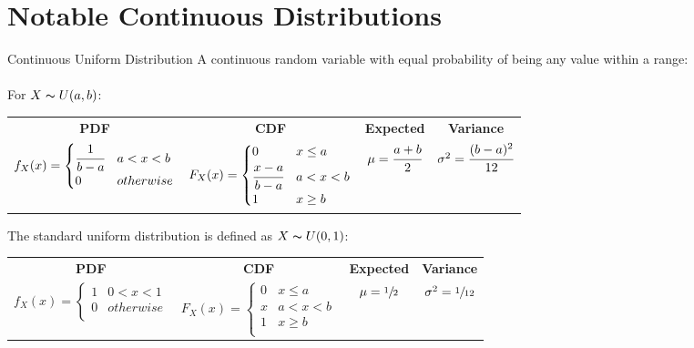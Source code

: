 \section{Notable Continuous Distributions}
\begin{definitionbox}{Continuous Uniform Distribution}
	A continuous random variable with equal probability of being any value within a range:
	\\
	\\ For $X \thicksim U(a,b)$:
	\begin{center}
		\begin{tabular}{c | c | c | c}
			\textbf{PDF}                         & \textbf{CDF}                          & \textbf{Expected}      & \textbf{Variance}                \\
			$f_X(x) = \begin{cases}
					\cfrac{1}{b - a} & a < x < b \\
					0                & otherwise \\
				\end{cases}$ & $F_X(x) = \begin{cases}
					0                    & x \leq a  \\
					\cfrac{x - a}{b - a} & a < x < b \\
					1                    & x \geq b  \\
				\end{cases}$ & $\mu = \cfrac{a+b}{2}$ & $\sigma^2 = \cfrac{(b-a)^2}{12}$ \\
		\end{tabular}
	\end{center}
	The standard uniform distribution is defined as $X \thicksim U(0,1)$:
	\begin{center}
		\begin{tabular}{c | c | c | c}
			\textbf{PDF}                          & \textbf{CDF}                          & \textbf{Expected}    & \textbf{Variance}          \\
			$f_X(x) = \begin{cases}
					1 & 0 < x < 1 \\
					0 & otherwise \\
				\end{cases}$ & $F_X(x) = \begin{cases}
					0 & x \leq a  \\
					x & a < x < b \\
					1 & x \geq b  \\
				\end{cases}$ & $\mu = \sfrac{1}{2}$ & $\sigma^2 = \sfrac{1}{12}$ \\

\end{tabular}
\end{center}
\end{definitionbox}
